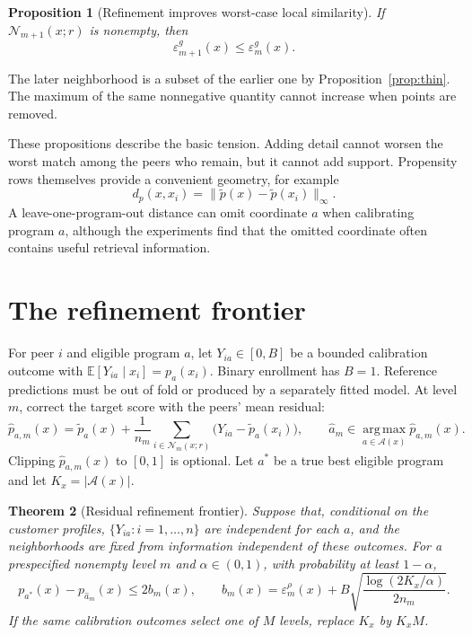 \documentclass[10pt]{article}
\makeatletter
\theoremstyle{noteplain}
\newtheorem{theorem}{Theorem}
\newtheorem{proposition}[theorem]{Proposition}
\theoremstyle{definition}
\renewenvironment{proof}[1][\proofname]{\par
  \pushQED{\qed}%
  \normalfont \topsep4\p@\@plus4\p@\relax
  \trivlist
  \item[\hskip\labelsep\bfseries #1\@addpunct{.}]\ignorespaces
}{\popQED\endtrivlist\@endpefalse}
\newcommand{\E}{\mathbb E}
\newcommand{\cA}{\mathcal A}
\newcommand{\cN}{\mathcal N}
\newcommand{\argmax}{\operatorname*{arg\,max}}
\makeatother
\begin{document}
\begin{proposition}[Refinement improves worst-case local similarity]\label{prop:mismatch}
If $\cN_{m+1}(x;r)$ is nonempty, then
\[
 \varepsilon_{m+1}^g(x)\le\varepsilon_m^g(x).
\]
\end{proposition}

\begin{proof}
The later neighborhood is a subset of the earlier one by Proposition~\ref{prop:thin}. The maximum of the same nonnegative quantity cannot increase when points are removed.
\end{proof}

These propositions describe the basic tension. Adding detail cannot worsen the worst match among the peers who remain, but it cannot add support. Propensity rows themselves provide a convenient geometry, for example
\[
 d_p(x,x_i)=\|\widetilde p(x)-\widetilde p(x_i)\|_\infty.
\]
A leave-one-program-out distance can omit coordinate $a$ when calibrating program $a$, although the experiments find that the omitted coordinate often contains useful retrieval information.

\section{The refinement frontier}

For peer $i$ and eligible program $a$, let $Y_{ia}\in[0,B]$ be a bounded calibration outcome with $\E[Y_{ia}\mid x_i]=p_a(x_i)$. Binary enrollment has $B=1$. Reference predictions must be out of fold or produced by a separately fitted model. At level $m$, correct the target score with the peers' mean residual:
\begin{equation}\label{eq:residual}
 \widehat p_{a,m}(x)=\widetilde p_a(x)
 +\frac{1}{n_m}\sum_{i\in\cN_m(x;r)}
 \bigl(Y_{ia}-\widetilde p_a(x_i)\bigr),
 \qquad
 \widehat a_m\in\argmax_{a\in\cA(x)}\widehat p_{a,m}(x).
\end{equation}
Clipping $\widehat p_{a,m}(x)$ to $[0,1]$ is optional. Let $a^*$ be a true best eligible program and let $K_x=|\cA(x)|$.

\begin{theorem}[Residual refinement frontier]\label{thm:frontier}
Suppose that, conditional on the customer profiles, $\{Y_{ia}:i=1,\ldots,n\}$ are independent for each $a$, and the neighborhoods are fixed from information independent of these outcomes. For a prespecified nonempty level $m$ and $\alpha\in(0,1)$, with probability at least $1-\alpha$,
\[
 p_{a^*}(x)-p_{\widehat a_m}(x)
 \le 2b_m(x),
 \qquad
 b_m(x)=\varepsilon_m^\rho(x)
 +B\sqrt{\frac{\log(2K_x/\alpha)}{2n_m}}.
\]
If the same calibration outcomes select one of $M$ levels, replace $K_x$ by $K_xM$.
\end{theorem}
\end{document}
